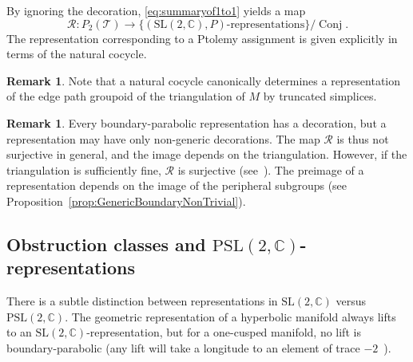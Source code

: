 \documentclass[12pt]{amsart}
\theoremstyle{definition}
\newtheorem{remark}[theorem]{Remark}
\numberwithin{equation}{section}
\def\SL{\mathrm{SL}}
\def\PSL{\mathrm{PSL}}
\DeclareMathOperator{\Conj}{Conj}
\def\C{\mathbb{C}}
\def\T{\mathcal{T}}
\begin{document}
By ignoring the decoration, \eqref{eq:summaryof1to1} yields a map
\begin{equation}\label{eq:PtolemyToRep}
\mathcal R\colon P_2(\T)\to \big\{(\SL(2,\C),P)\text{-representations}\big\}
\big/\Conj.
\end{equation}
The representation corresponding to a Ptolemy assignment is given explicitly in terms of the natural cocycle.

\begin{remark}
Note that a natural cocycle canonically determines a representation of the edge path groupoid of the triangulation of $M$ by truncated simplices.
\end{remark}

\begin{remark} 
Every boundary-parabolic representation has a decoration, but a representation may have only non-generic decorations. %
The map $\mathcal R$ is thus not surjective in general, and the image depends on the triangulation. However, if the triangulation is sufficiently fine, 
$\mathcal R$ is surjective (see~\cite{GaroufalidisThurstonZickert}). The preimage of a representation depends on the image of the peripheral subgroups (see Proposition~\ref{prop:GenericBoundaryNonTrivial}).\end{remark}



\subsection{Obstruction classes and $\PSL(2,\C)$-representations}
There is a subtle distinction between representations in $\SL(2,\C)$ versus $\PSL(2,\C)$. The geometric representation of a hyperbolic manifold always lifts to an $\SL(2,\C)$-representation, but for a one-cusped manifold, no lift is boundary-parabolic (any lift will take a longitude to an element of trace $-2$~\cite{Calegari}). %
\end{document}

